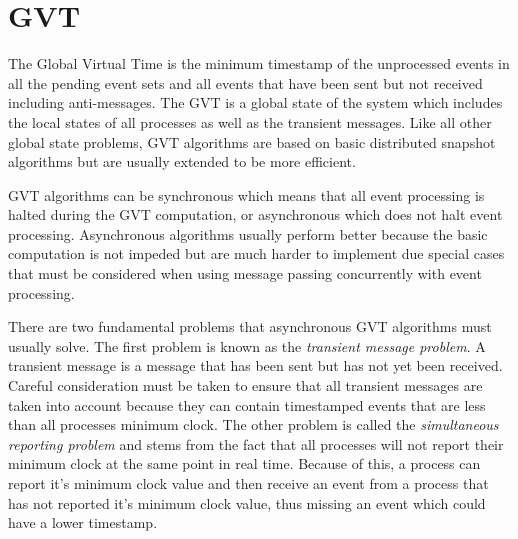 \documentclass[11pt]{book}
\begin{document}

\section{GVT}

The Global Virtual Time is the minimum timestamp of the unprocessed events in all the pending event
sets and all events that have been sent but not received including anti-messages. The GVT is a global
state of the system which includes the local states of all processes as well as the transient messages.
Like all other global state problems, GVT algorithms are based on basic distributed snapshot algorithms
\cite{chandy-85}\cite{lai-87}\cite{mattern-93} but are usually extended to be more efficient.

GVT algorithms can be synchronous which means that all event processing is halted during the GVT
computation, or asynchronous which does not halt event processing. Asynchronous algorithms usually
perform better because the basic computation is not impeded but are much harder to implement due
special cases that must be considered when using message passing concurrently with event processing.

There are two fundamental problems that asynchronous GVT algorithms must usually solve. The first problem is
known as the \emph{transient message problem}. A transient message is a message that has been sent
but has not yet been received. Careful consideration must be taken to ensure that all transient
messages are taken into account because they can contain timestamped events that are less than all
processes minimum clock. The other problem is called the \emph{simultaneous reporting problem} and
stems from the fact that all processes will not report their minimum clock at the same point in
real time. Because of this, a process can report it's minimum clock value and then receive an event
from a process that has not reported it's minimum clock value, thus missing an event which could have
a lower timestamp.
\end{document}
